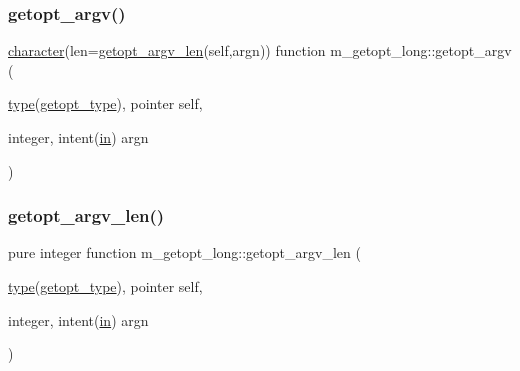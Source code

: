 \subsubsection{\texorpdfstring{getopt\+\_\+argv()}{getopt\_argv()}}
{\footnotesize\ttfamily \hyperlink{option__stopwatch_83_8txt_abd4b21fbbd175834027b5224bfe97e66}{character}(len=\hyperlink{namespacem__getopt__long_a379b13093de969a83f29283c3cce3c7a}{getopt\+\_\+argv\+\_\+len}(self,argn)) function m\+\_\+getopt\+\_\+long\+::getopt\+\_\+argv (\begin{DoxyParamCaption}\item[{\hyperlink{stop__watch_83_8txt_a70f0ead91c32e25323c03265aa302c1c}{type}(\hyperlink{structm__getopt__long_1_1getopt__type}{getopt\+\_\+type}), pointer}]{self,  }\item[{integer, intent(\hyperlink{M__journal_83_8txt_afce72651d1eed785a2132bee863b2f38}{in})}]{argn }\end{DoxyParamCaption})}

\mbox{\label{namespacem__getopt__long_a379b13093de969a83f29283c3cce3c7a}} 
\subsubsection{\texorpdfstring{getopt\+\_\+argv\+\_\+len()}{getopt\_argv\_len()}}
{\footnotesize\ttfamily pure integer function m\+\_\+getopt\+\_\+long\+::getopt\+\_\+argv\+\_\+len (\begin{DoxyParamCaption}\item[{\hyperlink{stop__watch_83_8txt_a70f0ead91c32e25323c03265aa302c1c}{type}(\hyperlink{structm__getopt__long_1_1getopt__type}{getopt\+\_\+type}), pointer}]{self,  }\item[{integer, intent(\hyperlink{M__journal_83_8txt_afce72651d1eed785a2132bee863b2f38}{in})}]{argn }\end{DoxyParamCaption})}

\mbox{\label{namespacem__getopt__long_af5aeba1b29425c5da2db9113aac0dc97}} 
